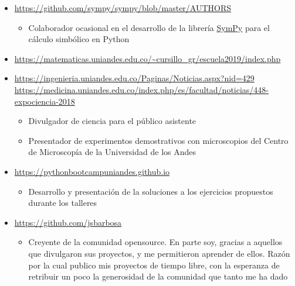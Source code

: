\documentclass[11pt, letterpaper, sans]{moderncv}        %
\begin{document}
	\begin{itemize}
		\item{
			{
				\url{https://github.com/sympy/sympy/blob/master/AUTHORS}
				\vspace{3pt}
				\begin{itemize}
					\item Colaborador ocasional en el desarrollo de la librería \href{https://www.sympy.org/en/index.html}{\color{blue}SymPy} para el cálculo simbólico en {\color{blue}Python}
				\end{itemize}
			}
		}
		\item{
			{
				\url{https://matematicas.uniandes.edu.co/~cursillo_gr/escuela2019/index.php}
			}
		}
	
		\item{
			{
				\url{https://ingenieria.uniandes.edu.co/Paginas/Noticias.aspx?nid=429}\\
				\url{https://medicina.uniandes.edu.co/index.php/es/facultad/noticias/448-expociencia-2018}
				\vspace{3pt}
				\begin{itemize}
					\item Divulgador de ciencia para el p\'ublico asistente
					\item Presentador de experimentos demostrativos con microscopios del Centro de Microscop\'ia de la Universidad de los Andes
				\end{itemize}
			}
		}
	
		\item{
			{
				\url{https://pythonbootcampuniandes.github.io}
				\vspace{3pt}
				\begin{itemize}
					\item Desarrollo y presentación de la soluciones a los ejercicios propuestos durante los talleres
				\end{itemize}
			}
		}
	
		\item{
			{
				\url{https://github.com/jsbarbosa}
				\vspace{3pt}
				\begin{itemize}
					\item Creyente de la comunidad opensource. En parte soy, gracias a aquellos que divulgaron sus proyectos, y me permitieron aprender de ellos. Razón por la cual publico mis proyectos de tiempo libre, con la esperanza de retribuir un poco la generosidad de la comunidad que tanto me ha dado
				\end{itemize}
			}
		}
	\end{itemize}
\end{document}
